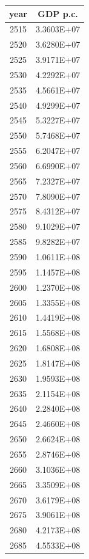 \documentclass[a4paper]{article}
\begin{document}
	\begin{tabular}{|c|c|}
		\hline
		year & GDP p.c. \\
		\hline
		2515 & 3.3603E+07 \\
		\hline
		2520 & 3.6280E+07 \\
		\hline
		2525 & 3.9171E+07 \\
		\hline
		2530 & 4.2292E+07 \\
		\hline
		2535 & 4.5661E+07 \\
		\hline
		2540 & 4.9299E+07 \\
		\hline
		2545 & 5.3227E+07 \\
		\hline
		2550 & 5.7468E+07 \\
		\hline
		2555 & 6.2047E+07 \\
		\hline
		2560 & 6.6990E+07 \\
		\hline
		2565 & 7.2327E+07 \\
		\hline
		2570 & 7.8090E+07 \\
		\hline
		2575 & 8.4312E+07 \\
		\hline
		2580 & 9.1029E+07 \\
		\hline
		2585 & 9.8282E+07 \\
		\hline
		2590 & 1.0611E+08 \\
		\hline
		2595 & 1.1457E+08 \\
		\hline
		2600 & 1.2370E+08 \\
		\hline
		2605 & 1.3355E+08 \\
		\hline
		2610 & 1.4419E+08 \\
		\hline
		2615 & 1.5568E+08 \\
		\hline
		2620 & 1.6808E+08 \\
		\hline
		2625 & 1.8147E+08 \\
		\hline
		2630 & 1.9593E+08 \\
		\hline
		2635 & 2.1154E+08 \\
		\hline
		2640 & 2.2840E+08 \\
		\hline
		2645 & 2.4660E+08 \\
		\hline
		2650 & 2.6624E+08 \\
		\hline
		2655 & 2.8746E+08 \\
		\hline
		2660 & 3.1036E+08 \\
		\hline
		2665 & 3.3509E+08 \\
		\hline
		2670 & 3.6179E+08 \\
		\hline
		2675 & 3.9061E+08 \\
		\hline
		2680 & 4.2173E+08 \\
		\hline
		2685 & 4.5533E+08 \\

\end{tabular}
\end{document}
